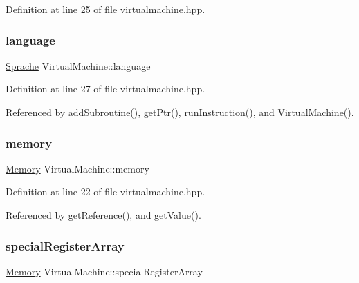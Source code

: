 Definition at line 25 of file virtualmachine.\+hpp.

\mbox{\label{class_virtual_machine_af4dd2663e7f1ea25ba6c88da94e6ef01}} 
\subsubsection{\texorpdfstring{language}{language}}
{\footnotesize\ttfamily \mbox{\hyperlink{class_sprache}{Sprache}} Virtual\+Machine\+::language\hspace{0.3cm}{\ttfamily [private]}}



Definition at line 27 of file virtualmachine.\+hpp.



Referenced by add\+Subroutine(), get\+Ptr(), run\+Instruction(), and Virtual\+Machine().

\mbox{\label{class_virtual_machine_a54136a9c003e36e77c28f31c7bef2dc2}} 
\subsubsection{\texorpdfstring{memory}{memory}}
{\footnotesize\ttfamily \mbox{\hyperlink{class_memory}{Memory}} Virtual\+Machine\+::memory\hspace{0.3cm}{\ttfamily [private]}}



Definition at line 22 of file virtualmachine.\+hpp.



Referenced by get\+Reference(), and get\+Value().

\mbox{\label{class_virtual_machine_a957d36537fd7570d30e342c5400ad4a6}} 
\subsubsection{\texorpdfstring{special\+Register\+Array}{specialRegisterArray}}
{\footnotesize\ttfamily \mbox{\hyperlink{class_memory}{Memory}} Virtual\+Machine\+::special\+Register\+Array\hspace{0.3cm}{\ttfamily [private]}}



